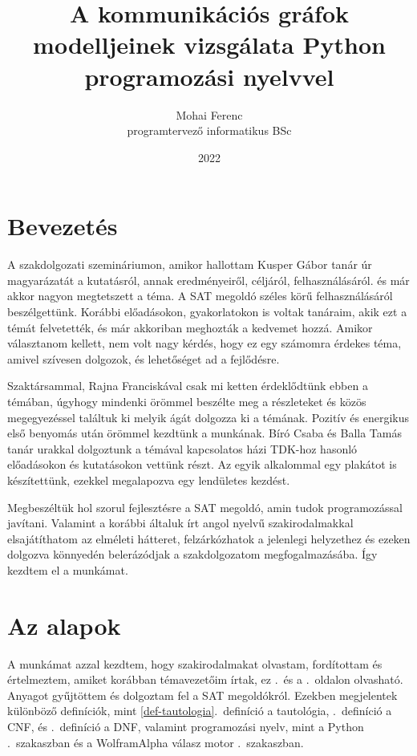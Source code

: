 \documentclass[
]{thesis-ekf}
\theoremstyle{definition}
\theoremstyle{remark}
\begin{document}
	\title{A kommunikációs gráfok modelljeinek vizsgálata Python programozási nyelvvel}
	\author{Mohai Ferenc\\programtervező informatikus BSc}
	\date{2022}
	
	\maketitle
	\tableofcontents
	
\chapter*{Bevezetés}
	A szakdolgozati szemináriumon, amikor hallottam Kusper Gábor tanár úr magyarázatát a kutatásról, annak eredményeiről, céljáról, felhasználásáról. és már akkor nagyon megtetszett a téma. A \textsc{SAT} megoldó széles körű felhasználásáról beszélgettünk. Korábbi előadásokon, gyakorlatokon is voltak tanáraim, akik ezt a témát felvetették, és már akkoriban meghozták a kedvemet hozzá. Amikor választanom kellett, nem volt nagy kérdés, hogy ez egy számomra érdekes téma, amivel szívesen dolgozok, és lehetőséget ad a fejlődésre.

	Szaktársammal, Rajna Franciskával csak mi ketten érdeklődtünk ebben a témában, úgyhogy mindenki örömmel beszélte meg a részleteket és közös megegyezéssel találtuk ki melyik ágát dolgozza ki a témának. Pozitív és energikus első benyomás után örömmel kezdtünk a munkának. Bíró Csaba és Balla Tamás tanár urakkal dolgoztunk a témával kapcsolatos házi TDK-hoz hasonló előadásokon és kutatásokon \cite{am} vettünk részt. Az egyik alkalommal egy plakátot is készítettünk, ezekkel megalapozva egy lendületes kezdést.
	
	Megbeszéltük hol szorul fejlesztésre a \textsc{SAT} megoldó, amin tudok programozással javítani. Valamint a korábbi általuk írt angol nyelvű szakirodalmakkal elsajátíthatom az elméleti hátteret, felzárkózhatok a jelenlegi helyzethez és ezeken dolgozva könnyedén belerázódjak a szakdolgozatom megfogalmazásába. Így kezdtem el a munkámat.
	
\chapter{Az alapok}
	
	A munkámat azzal kezdtem, hogy szakirodalmakat olvastam, fordítottam és értelmeztem, amiket korábban témavezetőim írtak, ez \az{\pageref{ssec-szakirodalom}}.~és a \az{\pageref{sec-szakirodalom-forditas}}.~oldalon olvasható. Anyagot gyűjtöttem és dolgoztam fel a \textsc{SAT} megoldókról. Ezekben megjelentek különböző definíciók, mint \ref{def-tautologia}.~definíció a tautológia, \az{\ref{def-cnf}}.~definíció a \textsc{CNF}, és \az{\ref{def-dnf}}.~definíció a \textsc{DNF}, valamint programozási nyelv, mint a Python \az{\ref{kif-python-programnyelv}}.~szakaszban és a WolframAlpha válasz motor \az{\ref{kif-wolframalpha-hasznalata}}.~szakaszban.
		
\end{document}
